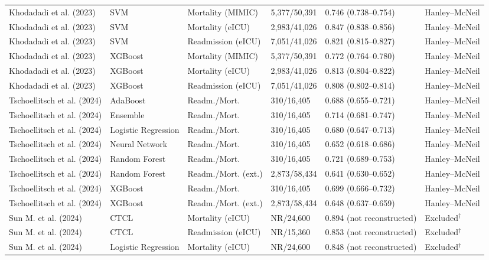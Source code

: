 \begin{table}[H]
\begin{adjustbox}{max width=\textwidth}
\begin{tabular}{llllll}
    Khodadadi et al. (2023) & SVM & Mortality (MIMIC) & 5,377/50,391 & 0.746 (0.738--0.754) & Hanley--McNeil \\
    Khodadadi et al. (2023) & SVM & Mortality (eICU) & 2,983/41,026 & 0.847 (0.838--0.856) & Hanley--McNeil \\
    Khodadadi et al. (2023) & SVM & Readmission (eICU) & 7,051/41,026 & 0.821 (0.815--0.827) & Hanley--McNeil \\
    Khodadadi et al. (2023) & XGBoost & Mortality (MIMIC) & 5,377/50,391 & 0.772 (0.764--0.780) & Hanley--McNeil \\
    Khodadadi et al. (2023) & XGBoost & Mortality (eICU) & 2,983/41,026 & 0.813 (0.804--0.822) & Hanley--McNeil \\
    Khodadadi et al. (2023) & XGBoost & Readmission (eICU) & 7,051/41,026 & 0.808 (0.802--0.814) & Hanley--McNeil \\
    Tschoellitsch et al. (2024) & AdaBoost & Readm./Mort. & 310/16,405 & 0.688 (0.655--0.721) & Hanley--McNeil \\
    Tschoellitsch et al. (2024) & Ensemble & Readm./Mort. & 310/16,405 & 0.714 (0.681--0.747) & Hanley--McNeil \\
    Tschoellitsch et al. (2024) & Logistic Regression & Readm./Mort. & 310/16,405 & 0.680 (0.647--0.713) & Hanley--McNeil \\
    Tschoellitsch et al. (2024) & Neural Network & Readm./Mort. & 310/16,405 & 0.652 (0.618--0.686) & Hanley--McNeil \\
    Tschoellitsch et al. (2024) & Random Forest & Readm./Mort. & 310/16,405 & 0.721 (0.689--0.753) & Hanley--McNeil \\
    Tschoellitsch et al. (2024) & Random Forest & Readm./Mort. (ext.) & 2,873/58,434 & 0.641 (0.630--0.652) & Hanley--McNeil \\
    Tschoellitsch et al. (2024) & XGBoost & Readm./Mort. & 310/16,405 & 0.699 (0.666--0.732) & Hanley--McNeil \\
    Tschoellitsch et al. (2024) & XGBoost & Readm./Mort. (ext.) & 2,873/58,434 & 0.648 (0.637--0.659) & Hanley--McNeil \\
    Sun M. et al. (2024) & CTCL & Mortality (eICU) & NR/24,600 & 0.894 (not reconstructed) & Excluded$^\dagger$ \\
    Sun M. et al. (2024) & CTCL & Readmission (eICU) & NR/15,360 & 0.853 (not reconstructed) & Excluded$^\dagger$ \\
    Sun M. et al. (2024) & Logistic Regression & Mortality (eICU) & NR/24,600 & 0.848 (not reconstructed) & Excluded$^\dagger$ \\

\end{tabular}
\end{adjustbox}
\end{table}
